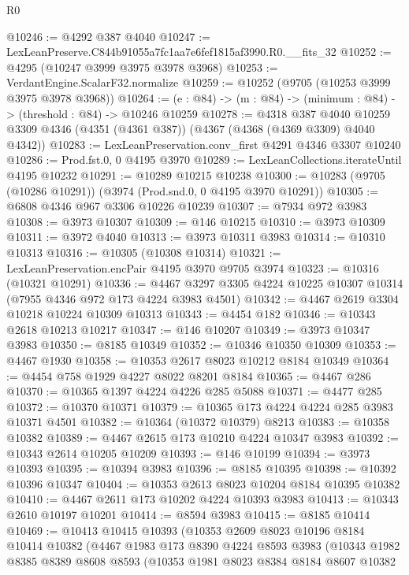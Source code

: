 \begin{lexlean}{R0}
\begin{coremodule}
@10246 := @4292 @387 @4040
@10247 := LexLeanPreserve.C844b91055a7fc1aa7e6fef1815af3990.R0.__fits_32
@10252 := @4295 (@10247 @3999 @3975 @3978 @3968)
@10253 := VerdantEngine.ScalarF32.normalize
@10259 := @10252 (@9705 (@10253 @3999 @3975 @3978 @3968))
@10264 := (e : @84) -> (m : @84) -> (minimum : @84) -> (threshold : @84) -> @10246 @10259
@10278 := @4318
    @387
    @4040
    @10259
    @3309
    @4346
    (@4351 (@4361 @387))
    (@4367 (@4368 (@4369 @3309) @4040 @4342))
@10283 := LexLeanPreservation.conv_first @4291 @4346 @3307 @10240
@10286 := Prod.fst.{0, 0} @4195 @3970
@10289 := LexLeanCollections.iterateUntil @4195 @10232
@10291 := @10289 @10215 @10238
@10300 := @10283 (@9705 (@10286 @10291)) (@3974 (Prod.snd.{0, 0} @4195 @3970 @10291))
@10305 := @6808 @4346 @967 @3306 @10226 @10239
@10307 := @7934 @972 @3983
@10308 := @3973 @10307
@10309 := @146 @10215
@10310 := @3973 @10309
@10311 := @3972 @4040
@10313 := @3973 @10311 @3983
@10314 := @10310 @10313
@10316 := @10305 (@10308 @10314)
@10321 := LexLeanPreservation.encPair @4195 @3970 @9705 @3974
@10323 := @10316 (@10321 @10291)
@10336 := @4467 @3297 @3305 @4224 @10225 @10307 @10314 (@7955 @4346 @972 @173 @4224 @3983 @4501)
@10342 := @4467 @2619 @3304 @10218 @10224 @10309 @10313
@10343 := @4454 @182
@10346 := @10343 @2618 @10213 @10217
@10347 := @146 @10207
@10349 := @3973 @10347 @3983
@10350 := @8185 @10349
@10352 := @10346 @10350 @10309
@10353 := @4467 @1930
@10358 := @10353 @2617 @8023 @10212 @8184 @10349
@10364 := @4454 @758 @1929 @4227 @8022 @8201 @8184
@10365 := @4467 @286
@10370 := @10365 @1397 @4224 @4226 @285 @5088
@10371 := @4477 @285
@10372 := @10370 @10371
@10379 := @10365 @173 @4224 @4224 @285 @3983 @10371 @4501
@10382 := @10364 (@10372 @10379) @8213
@10383 := @10358 @10382
@10389 := @4467 @2615 @173 @10210 @4224 @10347 @3983
@10392 := @10343 @2614 @10205 @10209
@10393 := @146 @10199
@10394 := @3973 @10393
@10395 := @10394 @3983
@10396 := @8185 @10395
@10398 := @10392 @10396 @10347
@10404 := @10353 @2613 @8023 @10204 @8184 @10395 @10382
@10410 := @4467 @2611 @173 @10202 @4224 @10393 @3983
@10413 := @10343 @2610 @10197 @10201
@10414 := @8594 @3983
@10415 := @8185 @10414
@10469 := @10413
    @10415
    @10393
    (@10353
      @2609
      @8023
      @10196
      @8184
      @10414
      @10382
      (@4467
        @1983
        @173
        @8390
        @4224
        @8593
        @3983
        (@10343
          @1982
          @8385
          @8389
          @8608
          @8593
          (@10353
            @1981
            @8023
            @8384
            @8184
            @8607
            @10382

\end{coremodule}
\end{lexlean}
